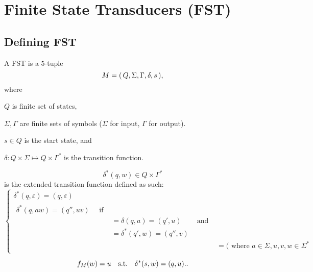 \section{Finite State Transducers (FST)}


\subsection{Defining FST}

\begin{definition}
    A FST is a $5$-tuple
    \[
        M = { \left(\, Q,\Sigma,\Gamma,\delta,s \,\right) }
    ,\]
    where
    \begin{compactitem}
    \item $Q$ is finite set of states,
    \item $\Sigma, \Gamma$ are finite sets of symbols 
            ($\Sigma$ for input, $\Gamma$ for output).
    \item $s \in Q$ is the start state, and
    \item $\delta \colon Q \times \Sigma \mapsto Q \times \Gamma^*$
        is the transition function.
    \end{compactitem}
\end{definition}

\begin{definition}
    \[ 
    \delta^*(q,w) \in Q \times \Gamma^*
    \]
    is the extended transition function defined as such:
    \[
        \begin{cases}
            \delta^*(q,\varepsilon) = (q,\varepsilon) \\
            \begin{matrix}
                \delta^*(q,aw)  =  (q'',uv) \quad \text{ if } \\
                              & =  \delta(q,a)    = (q',u) & \text{ and } \\
                              & =  \delta^*(q',w) = (q'',v) \\
                              & & &=  (\text{ where $a \in \Sigma, u,v,w \in \Sigma^*$}
            \end{matrix}
        \end{cases}
    \]
\end{definition}

\begin{definition}
\[
    f_M(w) = u \quad\text{\upshape s.t.}\quad \delta^*(s,w) = (q,u).
.\]
\end{definition}
